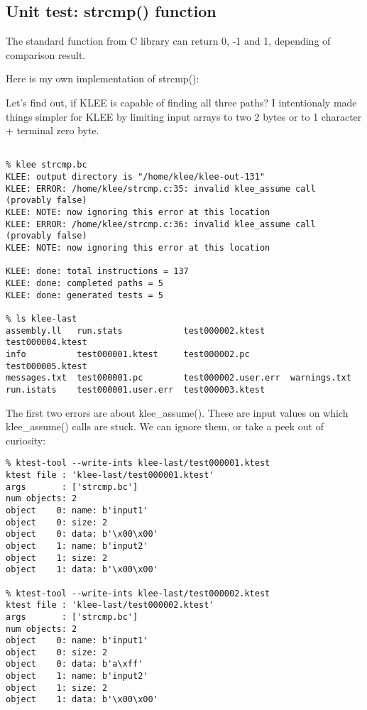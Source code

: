 \subsection{Unit test: strcmp() function}

The standard  function from C library can return 0, -1 and 1, depending of comparison result.

Here is my own implementation of strcmp():



Let's find out, if KLEE is capable of finding all three paths?
I intentionaly made things simpler for KLEE by limiting input arrays to two 2 bytes or to 1 character + terminal zero byte.

\begin{lstlisting}[basicstyle=\ttfamily, mathescape]
% clang -emit-llvm -c -g strcmp.c

% klee strcmp.bc
KLEE: output directory is "/home/klee/klee-out-131"
KLEE: ERROR: /home/klee/strcmp.c:35: invalid klee_assume call (provably false)
KLEE: NOTE: now ignoring this error at this location
KLEE: ERROR: /home/klee/strcmp.c:36: invalid klee_assume call (provably false)
KLEE: NOTE: now ignoring this error at this location

KLEE: done: total instructions = 137
KLEE: done: completed paths = 5
KLEE: done: generated tests = 5

% ls klee-last
assembly.ll   run.stats            test000002.ktest     test000004.ktest
info          test000001.ktest     test000002.pc        test000005.ktest
messages.txt  test000001.pc        test000002.user.err  warnings.txt
run.istats    test000001.user.err  test000003.ktest
\end{lstlisting}

The first two errors are about klee\_assume().
These are input values on which klee\_assume() calls are stuck.
We can ignore them, or take a peek out of curiosity:

\begin{lstlisting}
% ktest-tool --write-ints klee-last/test000001.ktest
ktest file : 'klee-last/test000001.ktest'
args       : ['strcmp.bc']
num objects: 2
object    0: name: b'input1'
object    0: size: 2
object    0: data: b'\x00\x00'
object    1: name: b'input2'
object    1: size: 2
object    1: data: b'\x00\x00'

% ktest-tool --write-ints klee-last/test000002.ktest
ktest file : 'klee-last/test000002.ktest'
args       : ['strcmp.bc']
num objects: 2
object    0: name: b'input1'
object    0: size: 2
object    0: data: b'a\xff'
object    1: name: b'input2'
object    1: size: 2
object    1: data: b'\x00\x00'
\end{lstlisting}

